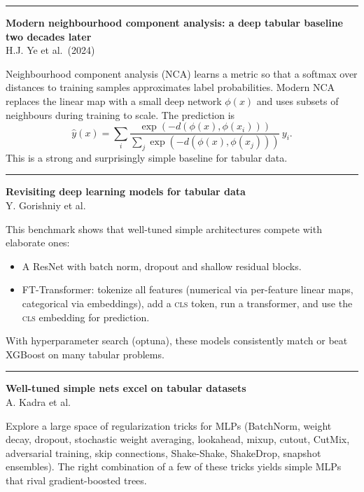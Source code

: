 \documentclass[a5paper]{article}
\providecommand{\tightlist}{%
  \setlength{\itemsep}{0pt}\setlength{\parskip}{0pt}}
\begin{document}
\begin{center}\rule{0.5\linewidth}{0.5pt}\end{center}

\textbf{Modern neighbourhood component analysis: a deep tabular baseline
two decades later}\\
H.J. Ye et al.~(2024)

Neighbourhood component analysis (NCA) learns a metric so that a softmax
over distances to training samples approximates label probabilities.
Modern NCA replaces the linear map with a small deep network $\phi(x)$ and
uses subsets of neighbours during training to scale. The prediction is
\[ \hat y(x) = \sum_i
\frac{\exp(-d(\phi(x),\phi(x_i)))}{\sum_j\exp(-d(\phi(x),\phi(x_j)))}\,y_i.
\]
This is a strong and surprisingly simple baseline for tabular data.

\begin{center}\rule{0.5\linewidth}{0.5pt}\end{center}

\textbf{Revisiting deep learning models for tabular data}\\
Y. Gorishniy et al.

This benchmark shows that well-tuned simple architectures compete with
elaborate ones:
\begin{itemize}
\tightlist
\item
  A ResNet with batch norm, dropout and shallow residual blocks.
\item
  FT-Transformer: tokenize all features (numerical via per-feature
  linear maps, categorical via embeddings), add a \textsc{cls} token, run a
  transformer, and use the \textsc{cls} embedding for prediction.
\end{itemize}

With hyperparameter search (optuna), these models consistently match or
beat XGBoost on many tabular problems.

\begin{center}\rule{0.5\linewidth}{0.5pt}\end{center}

\textbf{Well-tuned simple nets excel on tabular datasets}\\
A. Kadra et al.

Explore a large space of regularization tricks for MLPs (BatchNorm,
weight decay, dropout, stochastic weight averaging, lookahead, mixup,
cutout, CutMix, adversarial training, skip connections, Shake-Shake,
ShakeDrop, snapshot ensembles). The right combination of a few of these
tricks yields simple MLPs that rival gradient-boosted trees.
\end{document}
